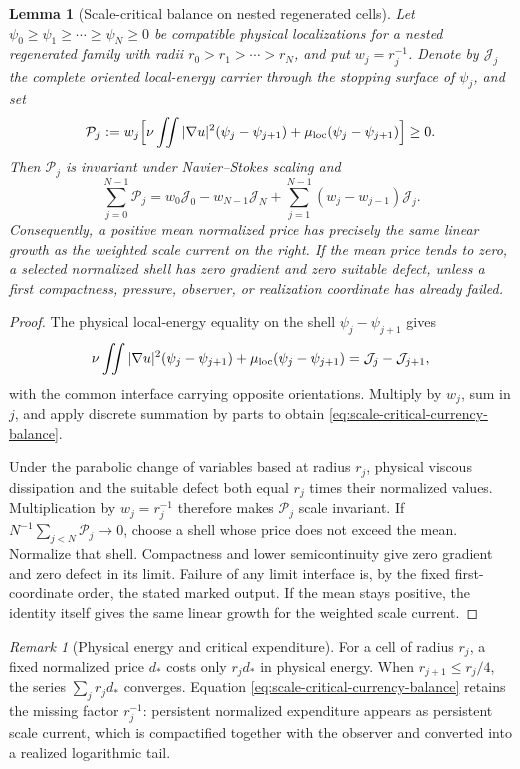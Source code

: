 \documentclass[11pt]{amsart}
\numberwithin{equation}{section}
\theoremstyle{plain}
\newtheorem{lemma}[lemma]{Lemma}
\theoremstyle{definition}
\theoremstyle{remark}
\newtheorem{remark}[remark]{Remark}
\begin{document}
\begin{lemma}[Scale-critical balance on nested regenerated cells]
\label{lem:scale-critical-currency-balance}
Let \(\psi_0\ge\psi_1\ge\cdots\ge\psi_N\ge0\) be compatible physical
localizations for a nested regenerated family with radii
\(r_0>r_1>\cdots>r_N\), and put \(w_j=r_j^{-1}\).  Denote by
\(\mathcal J_j\) the complete oriented local-energy carrier through the
stopping surface of \(\psi_j\), and set
\[
 \mathcal P_j:=w_j\Bigl[
   \nu\iint |\nabla u|^2(\psi_j-\psi_{j+1})
   +\mu_{\rm loc}(\psi_j-\psi_{j+1})\Bigr]\ge0.
\]
Then \(\mathcal P_j\) is invariant under Navier--Stokes scaling and
\begin{equation}\label{eq:scale-critical-currency-balance}
 \sum_{j=0}^{N-1}\mathcal P_j
 =w_0\mathcal J_0-w_{N-1}\mathcal J_N
  +\sum_{j=1}^{N-1}(w_j-w_{j-1})\mathcal J_j.
\end{equation}
Consequently, a positive mean normalized price has precisely the same linear
growth as the weighted scale current on the right.  If the mean price tends
to zero, a selected normalized shell has zero gradient and zero suitable
defect, unless a first compactness, pressure, observer, or realization
coordinate has already failed.
\end{lemma}

\begin{proof}
The physical local-energy equality on the shell
\(\psi_j-\psi_{j+1}\) gives
\[
 \nu\iint |\nabla u|^2(\psi_j-\psi_{j+1})
 +\mu_{\rm loc}(\psi_j-\psi_{j+1})
 =\mathcal J_j-\mathcal J_{j+1},
\]
with the common interface carrying opposite orientations.  Multiply by
\(w_j\), sum in \(j\), and apply discrete summation by parts to obtain
\eqref{eq:scale-critical-currency-balance}.

Under the parabolic change of variables based at radius \(r_j\), physical
viscous dissipation and the suitable defect both equal \(r_j\) times their
normalized values.  Multiplication by \(w_j=r_j^{-1}\) therefore makes
\(\mathcal P_j\) scale invariant.  If
\(N^{-1}\sum_{j<N}\mathcal P_j\to0\), choose a shell whose price does not
exceed the mean.  Normalize that shell.  Compactness and lower
semicontinuity give zero gradient and zero defect in its limit.  Failure of
any limit interface is, by the fixed first-coordinate order, the stated
marked output.  If the mean stays positive, the identity itself gives the
same linear growth for the weighted scale current.
\end{proof}

\begin{remark}[Physical energy and critical expenditure]
For a cell of radius \(r_j\), a fixed normalized price \(d_*\) costs only
\(r_jd_*\) in physical energy.  When \(r_{j+1}\le r_j/4\), the series
\(\sum_jr_jd_*\) converges.  Equation
\eqref{eq:scale-critical-currency-balance} retains the missing factor
\(r_j^{-1}\): persistent normalized expenditure appears as persistent scale
current, which is compactified together with the observer and converted into
a realized logarithmic tail.
\end{remark}
\end{document}
